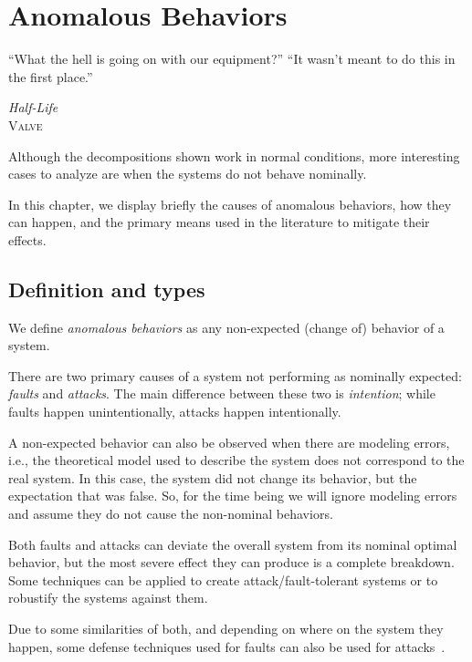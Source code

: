 \documentclass[../main.tex]{subfiles}
\begin{document}
\chapter[Anomalous Behaviors]{Anomalous Behaviors}\label{sec:anomalous}


\epigraph{``What the hell is going on with our equipment?''
``It wasn't meant to do this in the first place.''}
{\textit{Half-Life}\\\textsc{Valve}}

Although the decompositions shown work in normal conditions, more interesting cases to analyze are when the systems do not behave nominally.

In this chapter, we display briefly the causes of anomalous behaviors, how they can happen, and the primary means used in the literature to mitigate their effects.

\minitoc%

\section{Definition and types}
We define \emph{anomalous behaviors} as any non-expected (change of) behavior of a system.

There are two primary causes of a system not performing as nominally expected: \emph{faults} and \emph{attacks}.
The main difference between these two is \emph{intention}; while faults happen unintentionally, attacks happen intentionally.

\begin{remark}
  A non-expected behavior can also be observed when there are modeling errors, i.e., the theoretical model used to describe the system does not correspond to the real system.
  In this case, the system did not change its behavior, but the expectation that was false.
  So, for the time being we will ignore modeling errors and assume they do not cause the non-nominal behaviors.
\end{remark}

Both faults and attacks can deviate the overall system from its nominal optimal behavior, but the most severe effect they can produce is a complete breakdown.
Some techniques can be applied to create attack/fault-tolerant systems or to robustify the systems against them.

Due to some similarities of both, and depending on where on the system they happen, some defense techniques used for faults can also be used for attacks~.
\end{document}
